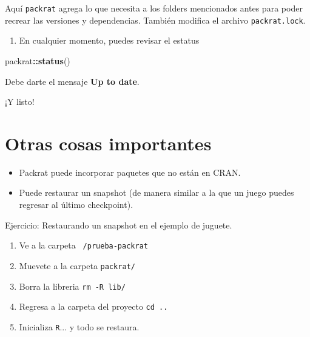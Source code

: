 \documentclass[]{article}
\newenvironment{Shaded}{\begin{snugshade}}{\end{snugshade}}
\newcommand{\KeywordTok}[1]{\textcolor[rgb]{0.13,0.29,0.53}{\textbf{#1}}}
\newcommand{\OperatorTok}[1]{\textcolor[rgb]{0.81,0.36,0.00}{\textbf{#1}}}
\newcommand{\NormalTok}[1]{#1}
\providecommand{\tightlist}{%
  \setlength{\itemsep}{0pt}\setlength{\parskip}{0pt}}
\begin{document}
Aquí \texttt{packrat} agrega lo que necesita a los folders mencionados
antes para poder recrear las versiones y dependencias. También modifica
el archivo \texttt{packrat.lock}.

\begin{enumerate}
\def\labelenumi{\arabic{enumi}.}
\setcounter{enumi}{3}
\tightlist
\item
  En cualquier momento, puedes revisar el estatus
\end{enumerate}

\begin{Shaded}
\begin{Highlighting}[]
\NormalTok{packrat}\OperatorTok{::}\KeywordTok{status}\NormalTok{()}
\end{Highlighting}
\end{Shaded}

Debe darte el mensaje \textbf{Up to date}.

¡Y listo!

\section{Otras cosas importantes}\label{otras-cosas-importantes}

\begin{itemize}
\tightlist
\item
  Packrat puede incorporar paquetes que no están en CRAN.
\item
  Puede restaurar un snapshot (de manera similar a la que un juego
  puedes regresar al último checkpoint).
\end{itemize}

\renewcommand\bcStyleTitre[1]{\large\textcolor{bbblack}{#1}}

\begin{bclogo}[
  couleur=llred,
  arrondi=0,
  logo=\bcstop,
  barre=none,
  noborder=true]{Ejercicio: Restaurando un snapshot en el ejemplo de juguete.}
\begin{enumerate}
\item Ve a la carpeta \texttt{~/prueba-packrat}
\item Muevete a la carpeta \texttt{packrat/}
\item Borra la libreria \texttt{rm -R lib/}
\item Regresa a la carpeta del proyecto \texttt{cd ..}
\item Inicializa \texttt{R}... y todo se restaura.
\end{enumerate}
\end{bclogo}
\end{document}
